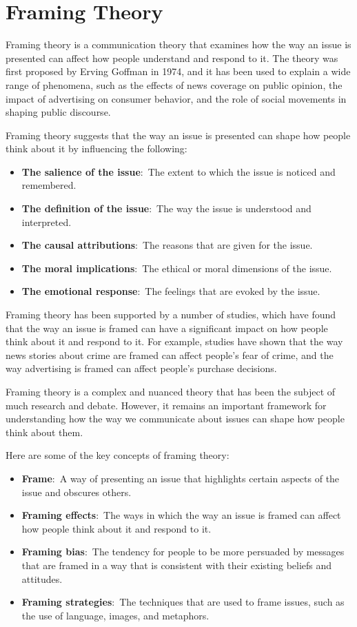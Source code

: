\documentclass[
  b5paper]{book}
\begin{document}
\hypertarget{framing-theory}{%
\section{Framing Theory}\label{framing-theory}}

Framing theory is a communication theory that examines how the way an issue is presented can affect how people understand and respond to it. The theory was first proposed by Erving Goffman in 1974, and it has been used to explain a wide range of phenomena, such as the effects of news coverage on public opinion, the impact of advertising on consumer behavior, and the role of social movements in shaping public discourse.

Framing theory suggests that the way an issue is presented can shape how people think about it by influencing the following:

\begin{itemize}
\item
  \textbf{The salience of the issue}:~The extent to which the issue is noticed and remembered.
\item
  \textbf{The definition of the issue}:~The way the issue is understood and interpreted.
\item
  \textbf{The causal attributions}:~The reasons that are given for the issue.
\item
  \textbf{The moral implications}:~The ethical or moral dimensions of the issue.
\item
  \textbf{The emotional response}:~The feelings that are evoked by the issue.
\end{itemize}

Framing theory has been supported by a number of studies, which have found that the way an issue is framed can have a significant impact on how people think about it and respond to it. For example, studies have shown that the way news stories about crime are framed can affect people's fear of crime, and the way advertising is framed can affect people's purchase decisions.

Framing theory is a complex and nuanced theory that has been the subject of much research and debate. However, it remains an important framework for understanding how the way we communicate about issues can shape how people think about them.

Here are some of the key concepts of framing theory:

\begin{itemize}
\item
  \textbf{Frame}:~A way of presenting an issue that highlights certain aspects of the issue and obscures others.
\item
  \textbf{Framing effects}:~The ways in which the way an issue is framed can affect how people think about it and respond to it.
\item
  \textbf{Framing bias}:~The tendency for people to be more persuaded by messages that are framed in a way that is consistent with their existing beliefs and attitudes.
\item
  \textbf{Framing strategies}:~The techniques that are used to frame issues, such as the use of language, images, and metaphors.
\end{itemize}
\end{document}

